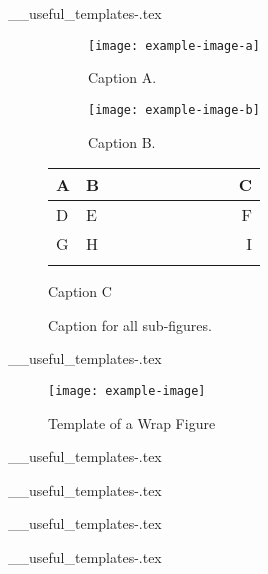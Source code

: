 \begin{filecontents*}{__useful_templates-\theusefultemplate.tex}
\begin{figure}[tph]
    \centering
    \begin{subfigure}{0.3\textwidth}
    \centering
    \texttt{[image: example-image-a]} %
    \caption{Caption A.}            %
    \label{subfig:subfig-example-a} %
    \end{subfigure}
    \hfill
    \begin{subfigure}{0.3\textwidth}
    \centering
    \texttt{[image: example-image-b]}
    \caption{Caption B.}
    \label{subfig:subfig-example-b}
    \end{subfigure}
    \hfill 
    \begin{subtable}[b]{0.3\textwidth}
        \begin{tabular}{L{0.1\linewidth} C{0.4\linewidth} r}
        \hhline{===} 
        \textbf{A} & \textbf{B} & \textbf{C}   \\ \hline 
        D & E & F   \\
        G & H & I   \\
        \hhline{===}
        \end{tabular}
        \caption{Caption C}
      \label{table:table}
  \end{subtable}
\caption{Caption for all sub-figures.}  %
\label{fig:subfig-example}              %
\end{figure}
\end{filecontents*}

\begin{filecontents*}{__useful_templates-\theusefultemplate.tex}
\begin{wrapfigure}{r}{0.4\linewidth}
    \centering
    \texttt{[image: example-image]}
    \caption{Template of a Wrap Figure}
    \label{fig:descriptive-label}
\end{wrapfigure}

\lipsum[1]
\end{filecontents*}


\begin{filecontents*}{__useful_templates-\theusefultemplate.tex}
\end{filecontents*}

\begin{filecontents*}{__useful_templates-\theusefultemplate.tex}
\end{filecontents*}


\begin{filecontents*}{__useful_templates-\theusefultemplate.tex}
\end{filecontents*}

\begin{filecontents*}{__useful_templates-\theusefultemplate.tex}
\end{filecontents*}
